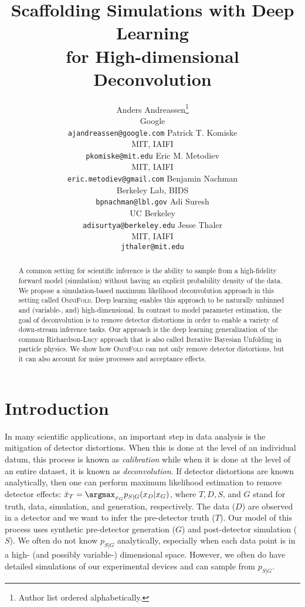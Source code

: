 \documentclass{article} %
\title{Scaffolding Simulations with Deep Learning \\ for High-dimensional Deconvolution}
\author{Anders Andreassen\thanks{Author list ordered alphabetically.} \\
Google\\
\small{\texttt{ajandreassen@google.com}}
\And
Patrick T. Komiske \\
MIT, IAIFI \\
\small{\texttt{pkomiske@mit.edu} }
\And
Eric M. Metodiev \\
MIT, IAIFI \\
\small{\texttt{eric.metodiev@gmail.com}}
\And
\AND
Benjamin Nachman\\
Berkeley Lab, BIDS \\
\small{\texttt{bpnachman@lbl.gov}}
\And
Adi Suresh\\
UC Berkeley \\
\small{\texttt{adisurtya@berkeley.edu}}
\And
Jesse Thaler\\
MIT, IAIFI \\
\small{\texttt{jthaler@mit.edu}}
}
\begin{document}
\maketitle

\begin{abstract}
A common setting for scientific inference is the ability to sample from a high-fidelity forward model (simulation) without having an explicit probability density of the data.    We propose a simulation-based maximum likelihood deconvolution approach in this setting called \textsc{OmniFold}.  Deep learning enables this approach to be naturally unbinned and (variable-, and) high-dimensional.  In contrast to model parameter estimation, the goal of deconvolution is to remove detector distortions in order to enable a variety of down-stream inference tasks.  Our approach is the deep learning generalization of the common Richardson-Lucy approach that is also called Iterative Bayesian Unfolding in particle physics.  We show how \textsc{OmniFold} can not only remove detector distortions, but it can also account for noise processes and acceptance effects.
\end{abstract}

\section{Introduction}

In many scientific applications, an important step in data analysis is the mitigation of detector distortions.   When this is done at the level of an individual datum, this process is known as \textit{calibration} while when it is done at the level of an entire dataset, it is known as \textit{deconvolution}.   If detector distortions are known analytically, then one can perform maximum likelihood estimation to remove detector effects: $\hat{x}_T=\argmax_{x_G} p_{S|G}(x_D|x_G)$, where $T, D, S$, and $G$ stand for truth, data, simulation, and generation, respectively.  The data ($D$) are observed in a detector and we want to infer the pre-detector truth ($T$).  Our model of this process uses synthetic pre-detector generation ($G$) and post-detector simulation ($S$).  We often do not know $p_{S|G}$ analytically, especially when each data point is in a high- (and possibly variable-) dimensional space.  However, we often do have detailed simulations of our experimental devices and can sample from $p_{S|G}$.
\end{document}
